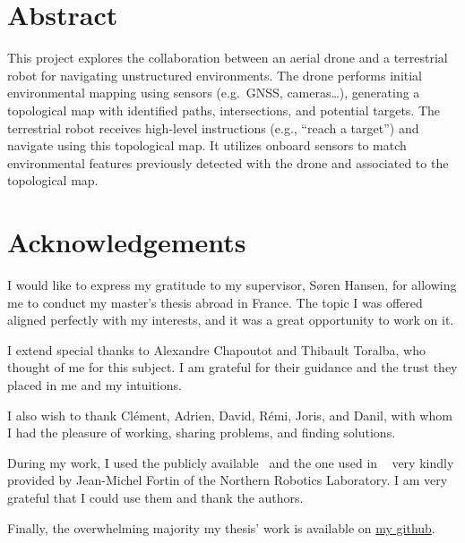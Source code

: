 \clearpage
\pagestyle{main}
\section*{Abstract}\label{sec:abstract}


This project explores the collaboration between an aerial drone and a terrestrial robot for navigating unstructured environments.
The drone performs initial environmental mapping using sensors (e.g.\ GNSS, cameras\ldots), generating a topological map with identified paths, intersections, and potential targets.
The terrestrial robot receives high-level instructions (e.g., “reach a target”) and navigate using this topological map.
It utilizes onboard sensors to match environmental features previously detected with the drone and associated to the topological map.


\clearpage
\section*{Acknowledgements}\label{sec:acknowledgements}

I would like to express my gratitude to my supervisor, Søren Hansen, for allowing me to conduct my master’s thesis abroad in France.
The topic I was offered aligned perfectly with my interests, and it was a great opportunity to work on it.

I extend special thanks to Alexandre Chapoutot and Thibault Toralba, who thought of me for this subject.
I am grateful for their guidance and the trust they placed in me and my intuitions.

I also wish to thank Clément, Adrien, David, Rémi, Joris, and Danil,
with whom I had the pleasure of working, sharing problems, and finding solutions.

During my work, I used the publicly available~\cite{noauthor_aukerman_nodate} and the one used in
~\cite{fortin_uav-assisted_2024} very kindly provided by Jean-Michel Fortin of the Northern Robotics Laboratory.
I am very grateful that I could use them and thank the authors.

Finally, the overwhelming majority my thesis' work is available on \href{https://github.com/Seb-sti1/mastersthesis}{my github}.